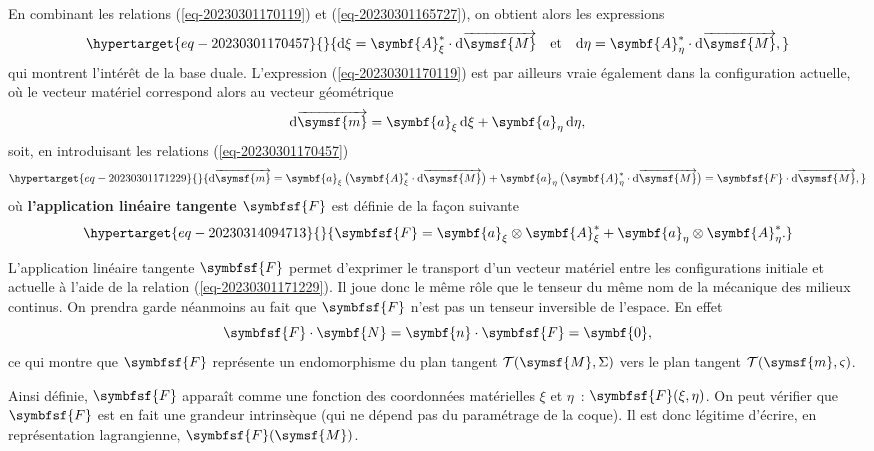 \documentclass[
  a4paper,
  DIV=11,
  numbers=noendperiod]{scrreprt}
\newcommand{\altvec}[1]{\overrightarrow{#1}}
\newcommand{\D}{{\mathrm d}}
\newcommand{\point}[1]{\symsf{#1}}
\newcommand{\tens}[1]{\symbfsf{#1}}
\renewcommand{\vec}[1]{\symbf{#1}}
\begin{document}
En combinant les relations (\ref{eq-20230301170119}) et
(\ref{eq-20230301165727}), on obtient alors les expressions
\begin{equation}\protect\hypertarget{eq-20230301170457}{}{
\D \xi = \vec{A}_\xi^\ast \cdot \D \altvec{\point{M}} \quad \text{et} \quad \D \eta = \vec{A}_\eta^\ast \cdot \D \altvec{\point{M}},
}\label{eq-20230301170457}\end{equation} qui montrent l'intérêt de la
base duale. L'expression (\ref{eq-20230301170119}) est par ailleurs
vraie également dans la configuration actuelle, où le vecteur matériel
correspond alors au vecteur géométrique \[
\D \altvec{\point{m}} = \vec{a}_\xi \, \D \xi + \vec{a}_\eta \, \D \eta,
\] soit, en introduisant les relations (\ref{eq-20230301170457})
\begin{equation}\protect\hypertarget{eq-20230301171229}{}{
\D \altvec{\point{m}} = \vec{a}_\xi \, \bigl( \vec{A}_\xi^\ast \cdot \D \altvec{\point{M}} \bigr) + \vec{a}_\eta \, \bigl( \vec{A}_\eta^\ast \cdot \D \altvec{\point{M}} \bigr) = \tens{F} \cdot \D \altvec{\point{M}},
}\label{eq-20230301171229}\end{equation} où \textbf{l'application
linéaire tangente \(\tens{F}\)} est définie de la façon suivante
\begin{equation}\protect\hypertarget{eq-20230314094713}{}{
\tens{F} = \vec{a}_\xi \otimes \vec{A}_\xi^\ast + \vec{a}_\eta \otimes \vec{A}_\eta^\ast.
}\label{eq-20230314094713}\end{equation}

L'application linéaire tangente \(\tens{F}\) permet d'exprimer le
transport d'un vecteur matériel entre les configurations initiale et
actuelle à l'aide de la relation (\ref{eq-20230301171229}). Il joue donc
le même rôle que le tenseur du même nom de la mécanique des milieux
continus. On prendra garde néanmoins au fait que \(\tens{F}\) n'est pas
un tenseur inversible de l'espace. En effet \[
\tens{F} \cdot \vec{N} = \vec{n} \cdot \tens{F} = \vec{0},
\] ce qui montre que \(\tens{F}\) représente un endomorphisme du plan
tangent \(\mathcal{T}(\point{M}, \Sigma)\) vers le plan tangent
\(\mathcal{T}(\point{m}, \varsigma)\).

\begin{tcolorbox}[enhanced jigsaw, toprule=.15mm, breakable, left=2mm, rightrule=.15mm, colbacktitle=quarto-callout-note-color!10!white, colframe=quarto-callout-note-color-frame, title=\textcolor{quarto-callout-note-color}{\faInfo}\hspace{0.5em}{Note}, bottomtitle=1mm, arc=.35mm, coltitle=black, opacityback=0, leftrule=.75mm, titlerule=0mm, toptitle=1mm, bottomrule=.15mm, opacitybacktitle=0.6, colback=white]

Ainsi définie, \(\tens{F}\) apparaît comme une fonction des coordonnées
matérielles \(\xi\) et \(\eta\)~: \(\tens{F}(\xi, \eta)\). On peut
vérifier que \(\tens{F}\) est en fait une grandeur intrinsèque (qui ne
dépend pas du paramétrage de la coque). Il est donc légitime d'écrire,
en représentation lagrangienne, \(\tens{F}(\point{M})\).

\end{tcolorbox}
\end{document}
